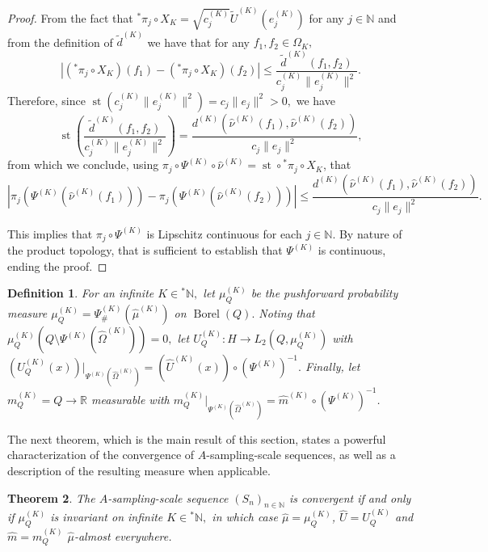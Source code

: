 \documentclass[10pt,a4paper]{amsart}
\newtheorem{thm}{Theorem}[section]
\newtheorem{definition}[thm]{Definition}
\def \St{\operatorname{st}}
\def \Borel{\operatorname{Borel}}
\def \HOM{\hat{\Omega}}
\def \HMU{\hat{\mu}}
\def \HNU{\hat{\nu}}
\def \HU{\hat{U}}
\def \Hm{\hat{m}}
\begin{document}
\begin{proof}
	From the fact that ${}^*\pi_j\circ X_K=\sqrt{c_j^{(K)}}\tilde{U}^{(K)}(e_j^{(K)})$ for any $j\in\mathbb{N}$ and from the definition of $\tilde{d}^{(K)}$ we have that for any $f_1,f_2\in\Omega_K,$ $$\left|({}^*\pi_j\circ X_K)(f_1)-({}^*\pi_j\circ X_K)(f_2) \right|\leq\frac{\tilde{d}^{(K)}(f_1,f_2)}{c_j^{(K)}\|e_j^{(K)}\|^2}.$$ Therefore, since $\St(c_j^{(K)}\|e_j^{(K)}\|^2)=c_j\|e_j\|^2>0,$ we have $$ \St\left(\frac{\tilde{d}^{(K)}(f_1,f_2)}{c_j^{(K)}\|e_j^{(K)}\|^2}\right)=\frac{d^{(K)}(\HNU^{(K)}(f_1),\HNU^{(K)}(f_2))}{c_j\|e_j\|^2},$$ from which we conclude, using $\pi_j\circ\Psi^{(K)}\circ\HNU^{(K)}=\St\circ{}^*\pi_j\circ X_K$, that $$\left|\pi_j(\Psi^{(K)}(\HNU^{(K)}(f_1)))-\pi_j(\Psi^{(K)}(\HNU^{(K)}(f_2)))\right|\leq\frac{d^{(K)}(\HNU^{(K)}(f_1),\HNU^{(K)}(f_2))}{c_j\|e_j\|^2}.$$ 
	
	This implies that $\pi_j\circ \Psi^{(K)}$ is Lipschitz continuous for each $j\in\mathbb{N}$. By nature of the product topology, that is sufficient to establish that $\Psi^{(K)}$ is continuous, ending the proof.
\end{proof}

\begin{definition}
	For an infinite $K\in{}^*\mathbb{N},$ let $\mu_Q^{(K)}$ be the pushforward probability measure $\mu_Q^{(K)}=\Psi^{(K)}_{\#}(\HMU^{(K)})$ on $\Borel(Q).$ Noting that $\mu_Q^{(K)}(Q\setminus\Psi^{(K)}(\HOM^{(K)}))=0,$ let $U_Q^{(K)}:H\rightarrow L_2(Q,\mu_Q^{(K)})$ with $(U_Q^{(K)}(x))|_{\Psi^{(K)}(\HOM^{(K)})}=(\HU^{(K)}(x))\circ (\Psi^{(K)})^{-1}.$ Finally, let $m_Q^{(K)}=Q\rightarrow\mathbb{R}$ measurable with $m_Q^{(K)}|_{\Psi^{(K)}(\HOM^{(K)})}=\Hm^{(K)}\circ (\Psi^{(K)})^{-1}$.
\end{definition}

The next theorem, which is the main result of this section, states a powerful characterization of the convergence of $A$-sampling-scale sequences, as well as a description of the resulting measure when applicable.


\begin{thm}
 The $A$-sampling-scale sequence $(S_n)_{n\in\mathbb{N}}$ is convergent if and only if $\mu_Q^{(K)}$ is invariant on infinite $K\in{}^*\mathbb{N},$ in which case $\HMU=\mu_Q^{(K)}$, $\HU=U_Q^{(K)}$ and $\Hm=m_Q^{(K)}$ $\HMU$-almost everywhere.
\end{thm}
\end{document}
